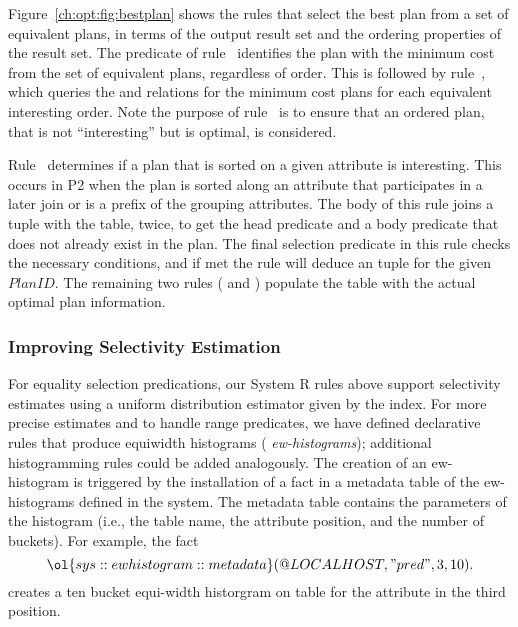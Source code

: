 Figure~\ref{ch:opt:fig:bestplan} shows the rules that select the best plan from
a set of equivalent plans, in terms of the output result set and the ordering
properties of the result set.  The  predicate of
rule~ identifies the plan with the minimum cost from the set of
equivalent plans, regardless of order.  This is followed by rule~,
which queries the  and  relations for the minimum
cost plans for each equivalent interesting order.  Note the purpose of
rule~ is to ensure that an ordered plan, that is not ``interesting''
but is optimal, is considered.  

Rule~ determines if a plan that is sorted on a given attribute is
interesting.  This occurs in P2 when the plan is sorted along an attribute that
participates in a later join or is a prefix of the grouping attributes.  The
body of this rule joins a  tuple with the  table, twice,
to get the head predicate and a body predicate that does not already exist in
the plan.  The final selection predicate in this rule checks the necessary
conditions, and if met the rule will deduce an  tuple for
the given $PlanID$.  The remaining two rules ( and ) populate
the  table with the actual optimal plan information.

\subsubsection{Improving Selectivity Estimation}

For equality selection predications, our System R rules above support
selectivity estimates using a uniform distribution estimator given by the
index.  For more precise estimates and to handle range predicates, we have
defined declarative rules that produce equiwidth histograms ({\em
ew-histograms}); additional histogramming rules could be added analogously.
The creation of an ew-histogram is triggered by the installation of a fact in a
metadata table of the ew-histograms defined in the system.  The metadata table
contains the parameters of the histogram (i.e., the table name, the attribute
position, and the number of buckets).  For example, the fact \[
\ol{sys::ewhistogram::metadata}(@LOCALHOST, "pred", 3, 10).  \] creates a ten
bucket equi-width historgram on table  for the attribute in the third
position.

